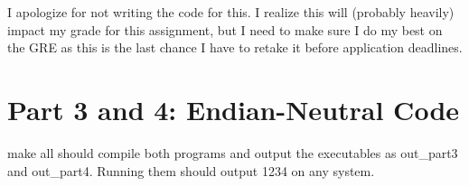 \documentclass[letterpaper,10pt,titlepage]{article}
\begin{document}
I apologize for not writing the code for this.
I realize this will (probably heavily) impact my grade for this assignment, but I need to make sure I do my best on the GRE as this is the last chance I have to retake it before application deadlines.

\section*{Part 3 and 4: Endian-Neutral Code}

make all should compile both programs and output the executables as out\_part3 and out\_part4.
Running them should output 1234 on any system.
\end{document}
